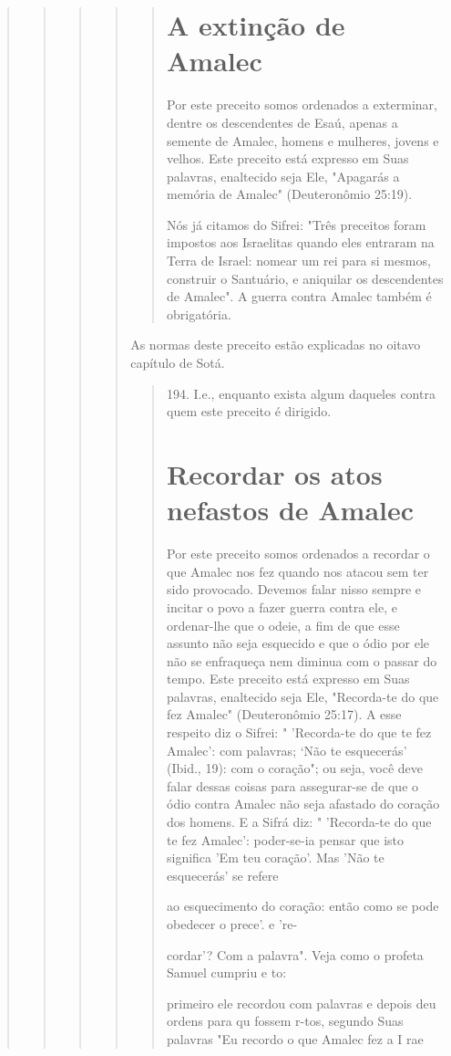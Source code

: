 \begin{quote}
\begin{quote}
\begin{quote}
\begin{quote}
\begin{quote}
\section{A extinção de Amalec}

Por este preceito somos ordenados a exterminar, dentre os descen­dentes
de Esaú, apenas a semente de Amalec, homens e mulheres, jovens e
ve­lhos. Este preceito está expresso em Suas palavras, enaltecido seja
Ele, "Apaga­rás a memória de Amalec" (Deuteronômio 25:19).

Nós já citamos do Sifrei: "Três preceitos foram impostos aos Israeli­tas
quando eles entraram na Terra de Israel: nomear um rei para si mesmos,
construir o Santuário, e aniquilar os descendentes de Amalec". A guerra
contra Amalec também é obrigatória.
\end{quote}

As normas deste preceito estão explicadas no oitavo capítulo de Sotá.

\begin{quote}
194. I.e., enquanto exista algum daqueles contra quem este preceito é
dirigido.



\section{Recordar os atos nefastos de Amalec}

Por este preceito somos ordenados a recordar o que Amalec nos fez quando
nos atacou sem ter sido provocado. Devemos falar nisso sempre e inci­tar
o povo a fazer guerra contra ele, e ordenar-lhe que o odeie, a fim de
que esse assunto não seja esquecido e que o ódio por ele não se
enfraqueça nem diminua com o passar do tempo. Este preceito está
expresso em Suas palavras, enaltecido seja Ele, "Recorda-te do que fez
Amalec" (Deuteronômio 25:17). A esse respeito diz o Sifrei: "
'Recorda-te do que te fez Amalec': com palavras; `Não te esquecerás'
(Ibid., 19): com o coração"; ou seja, você deve falar dessas coisas para
assegurar-se de que o ódio contra Amalec não seja afastado do cora­ção
dos homens. E a Sifrá diz: " 'Recorda-te do que te fez Amalec':
poder-se-ia pensar que isto significa 'Em teu coração'. Mas 'Não te
esquecerás' se refere

ao esquecimento do coração: então como se pode obedecer o prece'. e 're-

cordar'? Com a palavra". Veja como o profeta Samuel cumpriu e to:

primeiro ele recordou com palavras e depois deu ordens para qu fossem
r-tos, segundo Suas palavras "Eu recordo o que Amalec fez a I rae


\end{quote}
\end{quote}
\end{quote}
\end{quote}
\end{quote}
